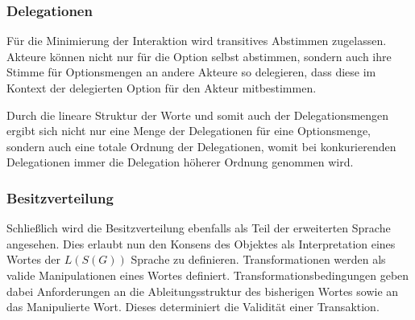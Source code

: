 \documentclass[]{article}
\begin{document}



\subsubsection*{Delegationen}

Für die Minimierung der Interaktion wird transitives Abstimmen zugelassen. Akteure können nicht nur für die Option selbst abstimmen, sondern auch ihre Stimme für Optionsmengen an andere Akteure so delegieren, dass diese im Kontext der delegierten Option für den Akteur mitbestimmen.

Durch die lineare Struktur der Worte und somit auch der Delegationsmengen ergibt sich nicht nur eine Menge der Delegationen für eine Optionsmenge, sondern auch eine totale Ordnung der Delegationen, womit bei konkurierenden Delegationen immer die Delegation höherer Ordnung genommen wird. 




\subsubsection*{Besitzverteilung}

Schließlich wird die Besitzverteilung ebenfalls als Teil der erweiterten Sprache angesehen. Dies erlaubt nun den Konsens des Objektes als Interpretation eines Wortes der $L(S(G))$ Sprache zu definieren. Transformationen werden als valide Manipulationen eines Wortes definiert. Transformationsbedingungen geben dabei Anforderungen an die Ableitungsstruktur des bisherigen Wortes sowie an das Manipulierte Wort. Dieses determiniert die Validität einer Transaktion.
\end{document}

